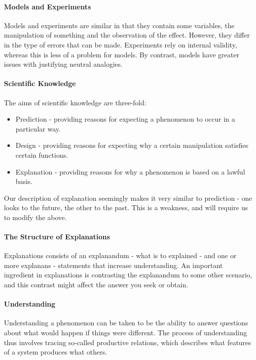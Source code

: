 \paragraph{Models and Experiments}
Models and experiments are similar in that they contain some variables, the manipulation of something and the observation of the effect. However, they differ in the type of errors that can be made. Experiments rely on internal validity, whereas this is less of a problem for models. By contrast, models have greater issues with justifying neutral analogies.

\paragraph{Scientific Knowledge}
The aims of scientific knowledge are three-fold:
\begin{itemize}
	\item Prediction - providing reasons for expecting a phenomenon to occur in a particular way.
	\item Design - providing reasons for expecting why a certain manipulation satisfies certain functions.
	\item Explanation - providing reasons for why a phenomenon is based on a lawful basis.
\end{itemize}
Our description of explanation seemingly makes it very similar to prediction - one looks to the future, the other to the past. This is a weakness, and will require us to modify the above.

\paragraph{The Structure of Explanations}
Explanations consists of an explanandum - what is to explained - and one or more explanans - statements that increase understanding. An important ingredient in explanations is contrasting the explanandum to some other scenario, and this contrast might affect the answer you seek or obtain.

\paragraph{Understanding}
Understanding a phenomenon can be taken to be the ability to answer questions about what would happen if things were different. The process of understanding thus involves tracing so-called productive relations, which describes what features of a system produces what others.

